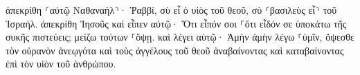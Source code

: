\documentclass{openreader}
\begin{document}
ἀπεκρίθη ⸂αὐτῷ Ναθαναήλ⸃· Ῥαββί, σὺ εἶ ὁ υἱὸς τοῦ θεοῦ, σὺ ⸂βασιλεὺς εἶ⸃ τοῦ Ἰσραήλ. 
ἀπεκρίθη Ἰησοῦς καὶ εἶπεν αὐτῷ· Ὅτι εἶπόν σοι ⸀ὅτι εἶδόν σε ὑποκάτω τῆς συκῆς πιστεύεις; μείζω τούτων ⸀ὄψῃ. 
καὶ λέγει αὐτῷ· Ἀμὴν ἀμὴν λέγω ⸀ὑμῖν, ὄψεσθε τὸν οὐρανὸν ἀνεῳγότα καὶ τοὺς ἀγγέλους τοῦ θεοῦ ἀναβαίνοντας καὶ καταβαίνοντας ἐπὶ τὸν υἱὸν τοῦ ἀνθρώπου. 
\end{document}
